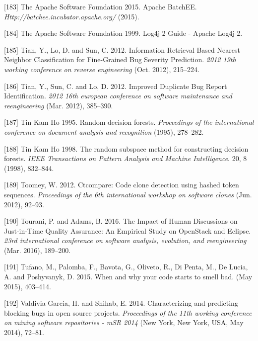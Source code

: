 \documentclass[12pt]{report}
\begin{document}
\hypertarget{ref-TheApacheSoftwareFoundation2015}{}
{[}183{]} The Apache Software Foundation 2015. Apache BatchEE.
\emph{Http://batchee.incubator.apache.org/} (2015).

\hypertarget{ref-TheApacheSoftwareFoundation1999}{}
{[}184{]} The Apache Software Foundation 1999. Log4j 2 Guide - Apache
Log4j 2.

\hypertarget{ref-Tian2012}{}
{[}185{]} Tian, Y., Lo, D. and Sun, C. 2012. Information Retrieval Based
Nearest Neighbor Classification for Fine-Grained Bug Severity
Prediction. \emph{2012 19th working conference on reverse engineering}
(Oct. 2012), 215--224.

\hypertarget{ref-Tian2012a}{}
{[}186{]} Tian, Y., Sun, C. and Lo, D. 2012. Improved Duplicate Bug
Report Identification. \emph{2012 16th european conference on software
maintenance and reengineering} (Mar. 2012), 385--390.

\hypertarget{ref-TinKamHo}{}
{[}187{]} Tin Kam Ho 1995. Random decision forests. \emph{Proceedings of
the international conference on document analysis and recognition}
(1995), 278--282.

\hypertarget{ref-TinKamHo1998}{}
{[}188{]} Tin Kam Ho 1998. The random subspace method for constructing
decision forests. \emph{IEEE Transactions on Pattern Analysis and
Machine Intelligence}. 20, 8 (1998), 832--844.

\hypertarget{ref-Toomey2012}{}
{[}189{]} Toomey, W. 2012. Ctcompare: Code clone detection using hashed
token sequences. \emph{Proceedings of the 6th international workshop on
software clones} (Jun. 2012), 92--93.

\hypertarget{ref-Tourani2016}{}
{[}190{]} Tourani, P. and Adams, B. 2016. The Impact of Human
Discussions on Just-in-Time Quality Assurance: An Empirical Study on
OpenStack and Eclipse. \emph{23rd international conference on software
analysis, evolution, and reengineering} (Mar. 2016), 189--200.

\hypertarget{ref-Tufano2015}{}
{[}191{]} Tufano, M., Palomba, F., Bavota, G., Oliveto, R., Di Penta,
M., De Lucia, A. and Poshyvanyk, D. 2015. When and why your code starts
to smell bad. (May 2015), 403--414.

\hypertarget{ref-ValdiviaGarcia2014}{}
{[}192{]} Valdivia Garcia, H. and Shihab, E. 2014. Characterizing and
predicting blocking bugs in open source projects. \emph{Proceedings of
the 11th working conference on mining software repositories - mSR 2014}
(New York, New York, USA, May 2014), 72--81.
\end{document}
